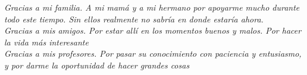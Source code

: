 \cleardoublepage
\thispagestyle{empty}
\begin{center}
\Large\itshape
Gracias a mi familia. A mi mamá y a mi hermano por apoyarme mucho durante todo este tiempo. Sin ellos realmente no sabría en donde estaría ahora.\\
Gracias a mis amigos. Por estar allí en los momentos buenos y malos. Por hacer la vida más interesante\\
Gracias a mis profesores. Por pasar su conocimiento con paciencia y entusiasmo, y por darme la oportunidad de hacer grandes cosas

\end{center}
